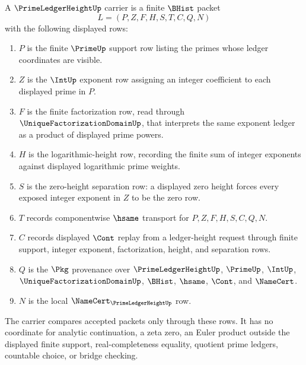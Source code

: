\begin{definition}
\label{def:prime-ledger-height-carrier}
A $\PrimeLedgerHeightUp$ carrier is a finite $\BHist$ packet
$$
L=(P,Z,F,H,S,T,C,Q,N)
$$
with the following displayed rows:
\begin{enumerate}
\item $P$ is the finite $\PrimeUp$ support row listing the primes whose ledger coordinates are visible.
\item $Z$ is the $\IntUp$ exponent row assigning an integer coefficient to each displayed prime in $P$.
\item $F$ is the finite factorization row, read through $\UniqueFactorizationDomainUp$, that interprets the same exponent ledger as a product of displayed prime powers.
\item $H$ is the logarithmic-height row, recording the finite sum of integer exponents against displayed logarithmic prime weights.
\item $S$ is the zero-height separation row: a displayed zero height forces every exposed integer exponent in $Z$ to be the zero row.
\item $T$ records componentwise $\hsame$ transport for $P,Z,F,H,S,C,Q,N$.
\item $C$ records displayed $\Cont$ replay from a ledger-height request through finite support, integer exponent, factorization, height, and separation rows.
\item $Q$ is the $\Pkg$ provenance over $\PrimeLedgerHeightUp$, $\PrimeUp$, $\IntUp$, $\UniqueFactorizationDomainUp$, $\BHist$, $\hsame$, $\Cont$, and $\NameCert$.
\item $N$ is the local $\NameCert_{\PrimeLedgerHeightUp}$ row.
\end{enumerate}
The carrier compares accepted packets only through these rows. It has no coordinate for analytic continuation, a zeta zero, an Euler product outside the displayed finite support, real-completeness equality, quotient prime ledgers, countable choice, or bridge checking.
\end{definition}

